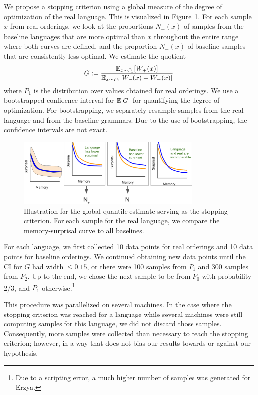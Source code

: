 We propose a stopping criterion using a global measure of the degree of optimization of the real language.
This is visualized in Figure~\ref{fig:quantile-global}.
For each sample $x$ from real orderings, we look at the proportions $N_+(x)$ of samples from the baseline languages that are more optimal than $x$ throughout the entire range where both curves are defined, and the proportion $N_-(x)$ of baseline samples that are consistently less optimal.
We estimate the quotient
\begin{equation}\label{eq:g}
	G :=	\frac{\mathbb{E}_{x \sim P_1}[W_+(x)]}{\mathbb{E}_{x \sim P_1}[W_+(x) + W_-(x)]}
\end{equation}
where $P_1$ is the distribution over values obtained for real orderings.
We use a bootstrapped confidence interval for $\mathbb{E}[G]$ for quantifying the degree of optimization.
For bootstrapping, we separately resample samples from the real language and from the baseline grammars.
Due to the use of bootstrapping, the confidence intervals are not exact.

\begin{figure}
	\begin{center}
\includegraphics[width=0.8\textwidth]{figures/quantile-global.png}
\end{center}
	\caption{Illustration for the global quantile estimate serving as the stopping criterion. For each sample for the real language, we compare the memory-surprisal curve to all baselines.}\label{fig:quantile-global}
\end{figure}


For each language, we first collected 10 data points for real orderings and 10 data points for baseline orderings.
We continued obtaining new data points until the CI for $G$ had width $\leq 0.15$, or there were 100 samples from $P_1$ and 300 samples from $P_2$.
Up to the end, we chose the next sample to be from $P_0$ with probability 2/3, and $P_1$ otherwise.\footnote{Due to a scripting error, a much higher number of samples was generated for Erzya.}

This procedure was parallelized on several machines.
In the case where the stopping criterion was reached for a language while several machines were still computing samples for this language, we did not discard those samples.
Consequently, more samples were collected than necessary to reach the stopping criterion; however, in a way that does not bias our results towards or against our hypothesis.

